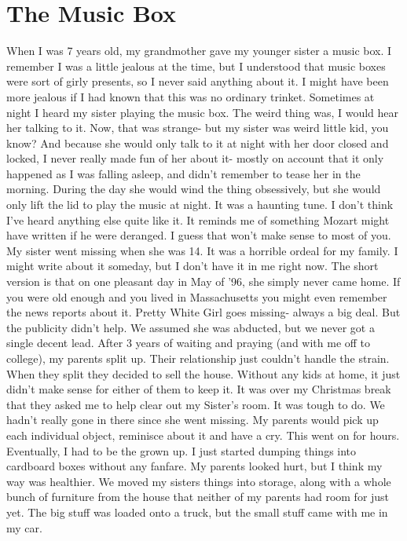 \documentclass[a4paper]{article}
\begin{document}
\section{The Music Box}
When I was 7 years old, my grandmother gave my younger sister a music box. I remember I was a little jealous at the time, but I understood that music boxes were sort of girly presents, so I never said anything about it. I might have been more jealous if I had known that this was no ordinary trinket.
Sometimes at night I heard my sister playing the music box. The weird thing was, I would hear her talking to it. Now, that was strange- but my sister was weird little kid, you know? And because she would only talk to it at night with her door closed and locked, I never really made fun of her about it- mostly on account that it only happened as I was falling asleep, and didn’t remember to tease her in the morning.
During the day she would wind the thing obsessively, but she would only lift the lid to play the music at night. It was a haunting tune. I don’t think I’ve heard anything else quite like it. It reminds me of something Mozart might have written if he were deranged. I guess that won’t make sense to most of you.
My sister went missing when she was 14. It was a horrible ordeal for my family. I might write about it someday, but I don’t have it in me right now. The short version is that on one pleasant day in May of ’96, she simply never came home. If you were old enough and you lived in Massachusetts you might even remember the news reports about it. Pretty White Girl goes missing- always a big deal. But the publicity didn’t help.
We assumed she was abducted, but we never got a single decent lead. After 3 years of waiting and praying (and with me off to college), my parents split up. Their relationship just couldn’t handle the strain.
When they split they decided to sell the house. Without any kids at home, it just didn’t make sense for either of them to keep it. It was over my Christmas break that they asked me to help clear out my Sister’s room.
It was tough to do. We hadn’t really gone in there since she went missing. My parents would pick up each individual object, reminisce about it and have a cry. This went on for hours. Eventually, I had to be the grown up. I just started dumping things into cardboard boxes without any fanfare. My parents looked hurt, but I think my way was healthier.
We moved my sisters things into storage, along with a whole bunch of furniture from the house that neither of my parents had room for just yet. The big stuff was loaded onto a truck, but the small stuff came with me in my car.
\end{document}
